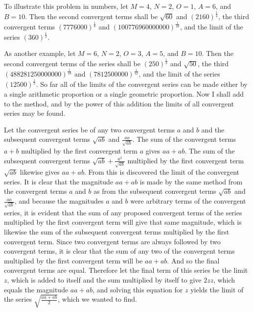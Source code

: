 \documentclass[11pt,letterpaper]{book}
\begin{document}
To illustrate this problem in numbers, let $M = 4$, $N = 2$, $O = 1$, $A = 6$,
and $B = 10$. Then the second convergent terms shall be $\sqrt{60}$ and
$\left(2160\right)^{\frac{1}{4}}$, the third convergent terms
$\left(7776000\right)^{\frac{1}{8}}$ and
$\left(100776960000000\right)^{\frac{1}{16}}$, and the limit of the series
$\left(360\right)^{\frac{1}{3}}$.

As another example, let $M = 6$, $N = 2$, $O = 3$, $A = 5$, and $B = 10$. Then
the second convergent terms of the series shall be
$\left(250\right)^{\frac{1}{3}}$ and $\sqrt{50}$, the third
$\left(488281250000000\right)^{\frac{1}{18}}$ and
$\left(7812500000\right)^{\frac{1}{12}}$, and the limit of the series
$\left(12500\right)^{\frac{1}{5}}$. So far all of the limits of the convergent
series can be made either by a single arithmetic proportion or a single
geometric proportion. Now I shall add to the method, and by the power of this
addition the limits of all convergent series may be found.

\newpage
{}

Let the convergent series be of any two convergent terms $a$ and $b$ and the
subsequent convergent terms $\sqrt{ab}$ and $\frac{aa}{\sqrt{ab}}$. The sum
of the convergent terms $a+b$ multiplied by the first convergent term $a$ gives
$aa+ab$. The sum of the subsequent convergent terms
$\sqrt{ab}+\frac{a^{2}}{\sqrt{ab}}$ multiplied by the first convergent term
$\sqrt{ab}$ likewise gives $aa+ab$. From this is discovered the limit of
the convergent series. It is clear that the magnitude $aa+ab$ is made by
the same method from the convergent terms $a$ and $b$ as from the subsequent
convergent terms $\sqrt{ab}$ and $\frac{aa}{\sqrt{ab}}$, and because the
magnitudes $a$ and $b$ were arbitrary terms of the convergent series,
it is evident that the sum of any proposed convergent terms of the series
multiplied by the first convergent term will give that same magnitude, which is
likewise the sum of the subsequent convergent terms multiplied by the first
convergent term. Since two convergent terms are always followed by two
convergent terms, it is clear that the sum of any two of the convergent
terms multiplied by the first convergent term will be $aa+ab$. And so the
final convergent terms are equal. Therefore let the final term of this series be
the limit $z$, which is added to itself and the sum multiplied by itself to give
$2zz$, which equals the magnitude $aa+ab$, and solving this equation
for $z$ yields the limit of the series $\sqrt{\frac{aa+ab}{2}}$, which we
wanted to find.
\end{document}
